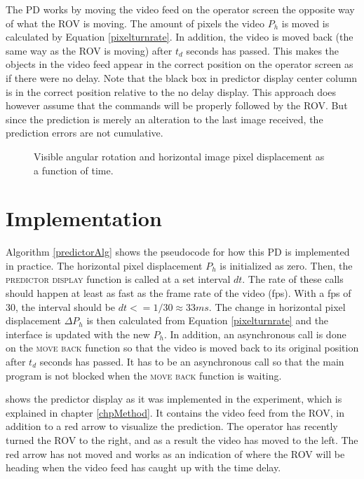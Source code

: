 The PD works by moving the video feed on the operator screen the opposite way of what the ROV is moving. The amount of pixels the video $P_h$ is moved is calculated by Equation \ref{pixelturnrate}. In addition, the video is moved back (the same way as the ROV is moving) after $t_d$ seconds has passed. This makes the objects in the video feed appear in the correct position on the operator screen as if there were no delay. Note that the black box in  predictor display center column is in the correct position relative to the no delay display. This approach does however assume that the commands will be properly followed by the ROV. But since the prediction is merely an alteration to the last image received, the prediction errors are not cumulative.


\begin{figure}[h!]    
    \centering           
    \def\svgwidth{\columnwidth}
    
    \caption{Visible angular rotation and horizontal image pixel displacement as a function of time.}
    \label{timePlot}
\end{figure}

\vspace{-3mm}
\section{Implementation}

Algorithm \ref{predictorAlg} shows the pseudocode for how this PD is implemented in practice. The horizontal pixel displacement $P_h$ is initialized as zero. Then, the \textsc{predictor display} function is called at a set interval $dt$. The rate of these calls should happen at least as fast as the frame rate of the video (fps). With a fps of 30, the interval should be $dt <= 1/30 \approx 33 ms$. The change in horizontal pixel displacement $\Delta P_h$ is then calculated from Equation \ref{pixelturnrate} and the interface is updated with the new $P_h$. In addition, an asynchronous call is done on the \textsc{move back} function so that the video is moved back to its original position after $t_d$ seconds has passed. It has to be an asynchronous call so that the main program is not blocked when the \textsc{move back} function is waiting.



 shows the predictor display as it was implemented in the experiment, which is explained in chapter \ref{chpMethod}. It contains the video feed from the ROV, in addition to a red arrow to visualize the prediction. The operator has recently turned the ROV to the right, and as a result the video has moved to the left. The red arrow has not moved and works as an indication of where the ROV will be heading when the video feed has caught up with the time delay.

